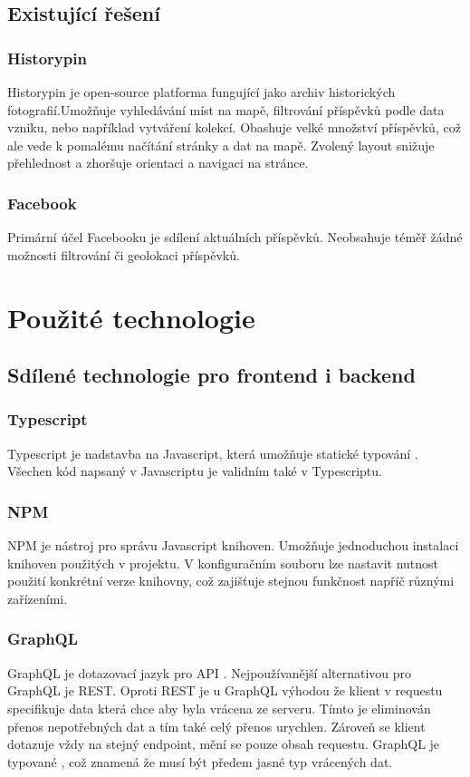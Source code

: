 \documentclass[12pt, a4paper,
 twoside,        %
 openright
]{report}
\begin{document}
\section{Existující řešení}
\subsection{Historypin}
Historypin je open-source platforma fungující jako archiv historických fotografií.Umožňuje vyhledávání míst na mapě, filtrování příspěvků podle data vzniku, nebo například vytváření kolekcí. Obashuje velké množství příspěvků, což ale vede k pomalému načítání stránky a dat na mapě. Zvolený layout snižuje přehlednost a zhoršuje orientaci a navigaci na stránce.
\subsection{Facebook}
Primární účel Facebooku je sdílení aktuálních příspěvků. Neobsahuje téměř žádné možnosti filtrování či geolokaci příspěvků. 

\chapter{Použité technologie}
\section{Sdílené technologie pro frontend i backend}
\subsection{Typescript}
Typescript je nadstavba na Javascript, která umožňuje statické typování \cite{DynamicVsStaticTyping}. Všechen kód napsaný v Javascriptu je validním také v Typescriptu. \cite{whatIsTypescript}\cite{typescriptForTheNewProgrammer}
\subsection{NPM}
NPM je nástroj pro správu Javascript knihoven. Umožňuje jednoduchou instalaci knihoven použitých v projektu. V konfiguračním souboru lze nastavit nutnost použití konkrétní verze knihovny, což zajišťuje stejnou funkčnost napříč různými zařízeními. \cite{whatIsNpmW3}\cite{aboutNpm}
\subsection{GraphQL}
GraphQL je dotazovací jazyk pro API \cite{graphqlIntroduction}. Nejpoužívanější alternativou pro GraphQL je REST. Oproti REST je u GraphQL výhodou že klient v requestu specifikuje data která chce aby byla vrácena ze serveru. Tímto je eliminován přenos nepotřebných dat a tím také celý přenos urychlen. Zároveň se klient dotazuje vždy na stejný endpoint, mění se pouze obsah requestu. GraphQL je typované \cite{graphqlTypes}, což znamená že musí být předem jasné typ vrácených dat. \cite{restApiRedHat}\cite{whatIsApiAws}
\end{document}
